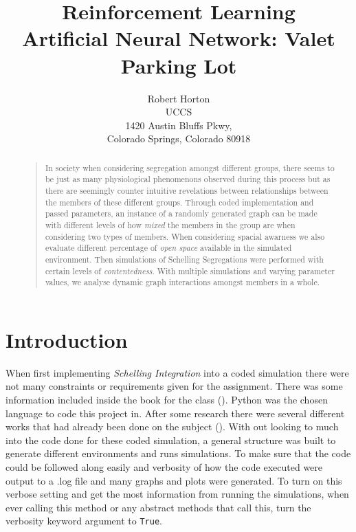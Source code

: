 \documentclass[letterpaper]{article}
\begin{document}
%
\title{Reinforcement Learning\\ Artificial Neural Network: Valet Parking Lot }
\author{Robert Horton\\
UCCS\\
1420 Austin Bluffs Pkwy,\\
Colorado Springs, Colorado 80918\\
}
\maketitle

\begin{abstract}
\begin{quote}
In society when considering segregation amongst different groups, there seems to be just as many physiological phenomenons observed during this process but as there are seemingly counter intuitive revelations between relationships between the members of these different groups. Through coded implementation and passed parameters, an instance of a randomly generated graph can be made with different levels of how \textit{mixed} the members in the group are when considering two types of members.  When considering spacial awarness we also evaluate different percentage of \textit{open space} available in the simulated environment.  Then simulations of Schelling Segregations were performed with certain levels of \textit{contentedness}.  With multiple simulations and varying parameter values, we analyse dynamic graph interactions amongst members in a whole.
\end{quote}
\end{abstract}

\section{Introduction}

When first implementing \textit{Schelling Integration} into a coded simulation there were not many constraints or requirements given for the assignment.  There was some information included inside the book for the class  (\cite{10.5555/1805895}). Python was the chosen language to code this project in.   After some research there were several different works that had already been done on the subject (\cite{AdilMoujahid}).  With out looking to much into the code done for these coded simulation, a general structure was built to generate different environments and runs simulations.  To make sure that the code could be followed along easily and verbosity of how the code executed were output to a .log file and many graphs and plots were generated.  To turn on this verbose setting and get the most information from running the simulations, when ever calling this method or any abstract methods that call this, turn the verbosity keyword argument to \texttt{True}.\\
\end{document}
